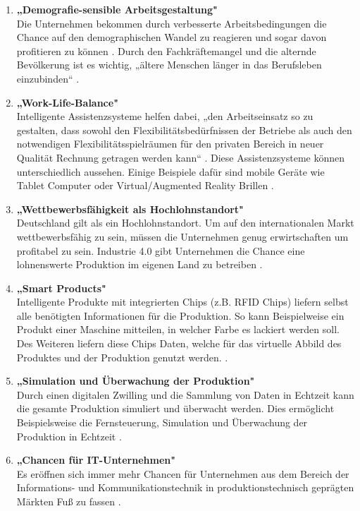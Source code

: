 \begin{enumerate}
	\item \textbf{„Demografie-sensible Arbeitsgestaltung"} \cite[S.20]{12} \\
	Die Unternehmen bekommen durch verbesserte Arbeitsbedingungen die Chance auf den 
	demographischen Wandel zu reagieren und sogar davon profitieren zu können \cite[S.20]{12}. Durch den Fachkräftemangel und die alternde Bevölkerung ist es wichtig,	„ältere Menschen länger in das Berufsleben einzubinden“ \cite{6}. \newpage
	\item \textbf{„Work-Life-Balance"} \cite[S.20]{12} \\
	Intelligente Assistenzsysteme helfen dabei, „den Arbeitseinsatz so zu gestalten, dass sowohl
	den Flexibilitätsbedürfnissen der Betriebe als auch den notwendigen Flexibilitätsspielräumen
	für den privaten Bereich in neuer Qualität Rechnung getragen werden kann“ \cite[S.20]{12}. Diese Assistenzsysteme können unterschiedlich aussehen. Einige Beispiele dafür sind mobile Geräte wie Tablet Computer oder Virtual/Augmented Reality Brillen \cite{6}.
	\item \textbf{„Wettbewerbsfähigkeit als Hochlohnstandort"} \cite[S.20]{12} \\
	Deutschland gilt als ein Hochlohnstandort. Um auf den internationalen Markt 
	wettbewerbsfähig zu sein, müssen die Unternehmen genug erwirtschaften um profitabel
	zu sein. Industrie 4.0 gibt Unternehmen die Chance eine lohnenswerte Produktion im eigenen Land zu betreiben \cite[S.20]{12}.
	\item \textbf{„Smart Products"} \cite{6} \\
	Intelligente Produkte mit integrierten Chips (z.B. RFID Chips) liefern selbst alle benötigten
	Informationen für die Produktion. So kann Beispielweise ein Produkt einer Maschine 
	mitteilen, in welcher Farbe es lackiert werden soll. Des Weiteren liefern diese Chips Daten, 
	welche für das virtuelle Abbild des Produktes und der Produktion genutzt werden. \cite{6}.
	\item \textbf{„Simulation und Überwachung der Produktion"} \cite{6} \\
	Durch einen digitalen Zwilling und die Sammlung von Daten in Echtzeit kann die gesamte
	Produktion simuliert und überwacht werden. Dies ermöglicht Beispielsweise die
	Fernsteuerung, Simulation und Überwachung der Produktion in Echtzeit \cite{6}.
	\item \textbf{„Chancen für IT-Unternehmen"} \cite[S.7]{2} \\
	Es eröffnen sich immer mehr Chancen für Unternehmen aus dem Bereich der Informations- und Kommunikationstechnik in produktionstechnisch geprägten Märkten Fuß zu fassen \cite[S.7]{2}.
\end{enumerate}

